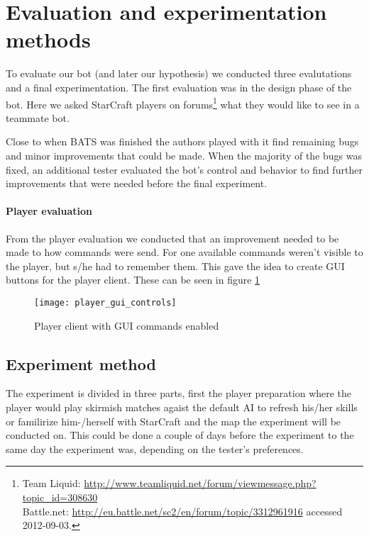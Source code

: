 \section{Evaluation and experimentation methods}
To evaluate our bot (and later our hypothesis) we conducted three evalutations and a final experimentation. The first evaluation was in the design phase of the bot. Here we asked StarCraft players on forums\footnote{
Team Liquid: \url{http://www.teamliquid.net/forum/viewmessage.php?topic_id=308630}\\
Battle.net: \url{http://eu.battle.net/sc2/en/forum/topic/3312961916} accessed 2012-09-03.} what they would like to see in a teammate bot.

Close to when BATS was finished the authors played with it find remaining bugs and minor improvements that could be made. When the majority of the bugs was fixed, an additional tester evaluated the bot’s control and behavior to find further improvements that were needed before the final experiment.

\paragraph{Player evaluation}
From the player evaluation we conducted that an improvement needed to be made to how commands were send. For one available commands weren’t visible to the player, but s/he had to remember them. This gave the idea to create GUI buttons for the player client. These can be seen in figure \ref{fig:player_commands_gui}

\begin{figure}[htb]
\centering
\texttt{[image: player\_gui\_controls]}
\caption{Player client with GUI commands enabled}
\label{fig:player_commands_gui}
\end{figure}

\subsection{Experiment method}
The experiment is divided in three parts, first the player preparation where the player would play skirmish matches agaist the default AI to refresh his/her skills or familirize him-/herself with StarCraft and the map the experiment will be conducted on. This could be done a couple of days before the experiment to the same day the experiment was, depending on the tester’s preferences.

